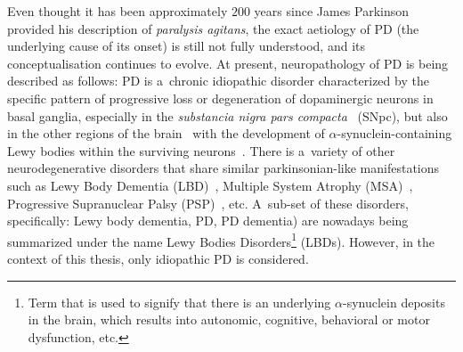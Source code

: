 Even thought it has been approximately $200$ years since James Parkinson provided his description of \textit{paralysis agitans}, the exact aetiology of PD (the underlying cause of its onset) is still not fully understood, and its conceptualisation continues to evolve. At present, neuropathology of PD is being described as follows: PD is a~chronic idiopathic disorder characterized by the specific pattern of progressive loss or degeneration of dopaminergic neurons in basal ganglia, especially in the \textit{substancia nigra pars compacta}~\cite{Hornykiewicz1998} (SNpc), but also in the other regions of the brain~\cite{Dickson2012} with the development of $\alpha$-synuclein-containing Lewy bodies within the surviving neurons~\cite{Forno1996}. There is a~variety of other neurodegenerative disorders that share similar parkinsonian-like manifestations such as Lewy Body Dementia (LBD)~\cite{Mckeith2007}, Multiple System Atrophy (MSA)~\cite{Wenning2004}, Progressive Supranuclear Palsy (PSP)~\cite{Cole2003}, etc. A~sub-set of these disorders, specifically: Lewy body dementia, PD, PD dementia) are nowadays being summarized under the name Lewy Bodies Disorders\footnote{Term that is used to signify that there is an underlying $\alpha$-synuclein deposits in the brain, which results into autonomic, cognitive, behavioral or motor dysfunction, etc.} (LBDs). However, in the context of this thesis, only idiopathic PD is considered.


